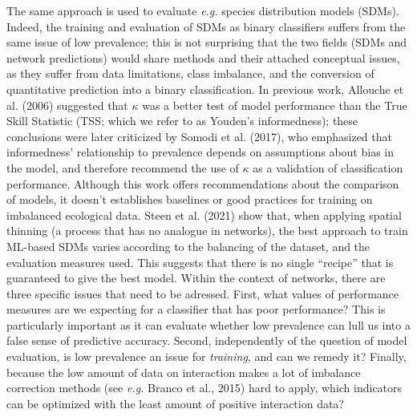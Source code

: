 \documentclass[11pt]{article}
\begin{document}
The same approach is used to evaluate \emph{e.g.} species distribution
models (SDMs). Indeed, the training and evaluation of SDMs as binary
classifiers suffers from the same issue of low prevalence; this is not
surprising that the two fields (SDMs and network predictions) would
share methods and their attached conceptual issues, as they suffer from
data limitations, class imbalance, and the conversion of quantitative
prediction into a binary classification. In previous work, Allouche et
al. (2006) suggested that \(\kappa\) was a better test of model
performance than the True Skill Statistic (TSS; which we refer to as
Youden's informedness); these conclusions were later criticized by
Somodi et al. (2017), who emphasized that informedness' relationship to
prevalence depends on assumptions about bias in the model, and therefore
recommend the use of \(\kappa\) as a validation of classification
performance. Although this work offers recommendations about the
comparison of models, it doesn't establishes baselines or good practices
for training on imbalanced ecological data. Steen et al. (2021) show
that, when applying spatial thinning (a process that has no analogue in
networks), the best approach to train ML-based SDMs varies according to
the balancing of the dataset, and the evaluation measures used. This
suggests that there is no single ``recipe'' that is guaranteed to give
the best model. Within the context of networks, there are three specific
issues that need to be adressed. First, what values of performance
measures are we expecting for a classifier that has poor performance?
This is particularly important as it can evaluate whether low prevalence
can lull us into a false sense of predictive accuracy. Second,
independently of the question of model evaluation, is low prevalence an
issue for \emph{training}, and can we remedy it? Finally, because the
low amount of data on interaction makes a lot of imbalance correction
methods (see \emph{e.g.} Branco et al., 2015) hard to apply, which
indicators can be optimized with the least amount of positive
interaction data?
\end{document}
